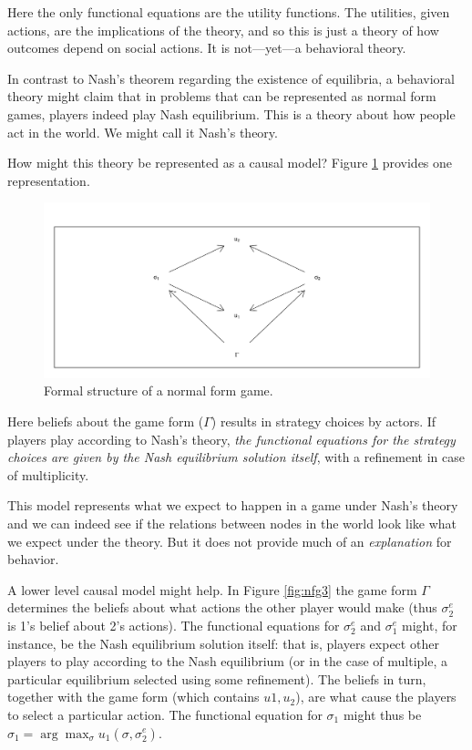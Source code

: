 \documentclass[
  12pt,
]{book}
\begin{document}
Here the only functional equations are the utility functions. The utilities, given actions, are the implications of the theory, and so this is just a theory of how outcomes depend on social actions. It is not---yet---a behavioral theory.

In contrast to Nash's theorem regarding the existence of equilibria, a behavioral theory might claim that in problems that can be represented as normal form games, players indeed play Nash equilibrium. This is a theory about how people act in the world. We might call it Nash's theory.

How might this theory be represented as a causal model? Figure \ref{fig:nfg2} provides one representation.

\begin{figure}

{\centering \includegraphics[width=0.8\linewidth]{ii_files/figure-latex/nfg2-1} 

}

\caption{Formal structure of a normal form game.}\label{fig:nfg2}
\end{figure}

Here beliefs about the game form (\(\Gamma\)) results in strategy choices by actors. If players play according to Nash's theory, \emph{the functional equations for the strategy choices are given by the Nash equilibrium solution itself}, with a refinement in case of multiplicity.

This model represents what we expect to happen in a game under Nash's theory and we can indeed see if the relations between nodes in the world look like what we expect under the theory. But it does not provide much of an \emph{explanation} for behavior.

A lower level causal model might help. In Figure \ref{fig:nfg3}
the game form \(\Gamma\) determines the beliefs about what actions the other player would make (thus \(\sigma_2^e\) is 1's belief about 2's actions). The functional equations for \(\sigma_2^e\) and \(\sigma_1^e\) might, for instance, be the Nash equilibrium solution itself: that is, players expect other players to play according to the Nash equilibrium (or in the case of multiple, a particular equilibrium selected using some refinement). The beliefs in turn, together with the game form (which contains \(u1, u_2\)), are what cause the players to select a particular action. The functional equation for \(\sigma_1\) might thus be \(\sigma_1 = \arg \max_\sigma u_1(\sigma, \sigma_2^e)\).
\end{document}
